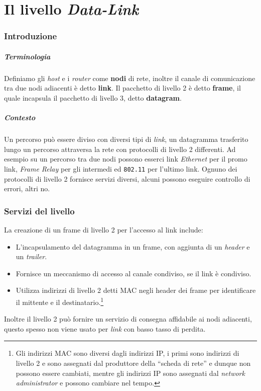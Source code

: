 \chapter{Il livello \textit{Data-Link}}
\label{ch:livelloDataLink}

    \subsection{Introduzione}
        \paragraph{Terminologia} Definiamo gli \textit{host} e i \textit{router} come \textbf{nodi} di rete, inoltre il canale di comunicazione tra due nodi adiacenti è detto \textbf{link}. Il pacchetto di livello 2 è detto \textbf{frame}, il quale incapsula il pacchetto di livello 3, detto \textbf{datagram}.
        \paragraph{Contesto} Un percorso può essere diviso con diversi tipi di \textit{link}, un datagramma trasferito lungo un percorso attraversa la rete con protocolli di livello 2 differenti. Ad esempio su un percorso tra due nodi possono esserci link \textit{Ethernet} per il promo link, \textit{Frame Relay} per gli intermedi ed \texttt{802.11} per l'ultimo link. Ognuno dei protocolli di livello 2 fornisce servizi diversi, alcuni possono eseguire controllo di errori, altri no.
    \subsection{Servizi del livello}
        La creazione di un frame di livello 2 per l'accesso al link include:
        \begin{itemize}
            \item L'incapsulamento del datagramma in un frame, con aggiunta di un \textit{header} e un \textit{trailer}.
            \item Fornisce un meccanismo di accesso al canale condiviso, se il link è condiviso.
            \item Utilizza indirizzi di livello 2 detti \Acrshort*{MAC} negli header dei frame per identificare il mittente e il destinatario.\footnote{Gli indirizzi \Acrshort*{MAC} sono diversi dagli indirizzi \Acrshort*{IP}, i primi sono indirizzi di livello 2 e sono assegnati dal produttore della ``scheda di rete'' e dunque non possono essere cambiati, mentre gli indirizzi \Acrshort*{IP} sono assegnati dal \textit{network administrator} e possono cambiare nel tempo.}
        \end{itemize}
        Inoltre il livello 2 può fornire un servizio di consegna affidabile ai nodi adiacenti, questo spesso non viene usato per \textit{link} con basso tasso di perdita.
